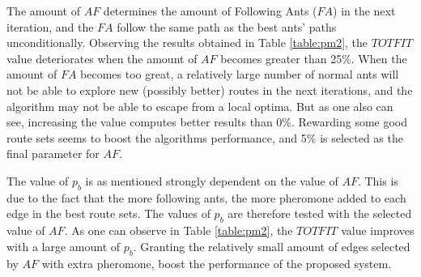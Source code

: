 The amount of $AF$ determines the amount of Following Ants ($FA$) in the next iteration, and the $FA$ follow the same path as the best ants' paths unconditionally. Observing the results obtained in Table \vref{table:pm2}, the $TOTFIT$ value deteriorates when the amount of $AF$ becomes greater than 25\%. When the amount of $FA$ becomes too great, a relatively large number of normal ants will not be able to explore new (possibly better) routes in the next iterations, and the algorithm may not be able to escape from a local optima. But as one also can see, increasing the value computes better results than 0\%. Rewarding some good route sets seems to boost the algorithms performance, and 5\% is selected as the final parameter for $AF$. 

The value of $p_b$ is as mentioned strongly dependent on the value of $AF$. This is due to the fact that the more following ants, the more pheromone added to each edge in the best route sets. The values of $p_b$ are therefore tested with the selected value of $AF$. As one can observe in Table \vref{table:pm2}, the $TOTFIT$ value improves with a large amount of $p_b$. Granting the relatively small amount of edges selected by $AF$ with extra pheromone, boost the performance of the proposed system. 

